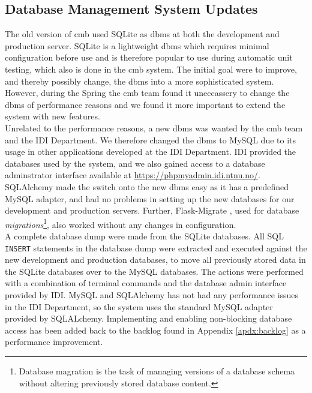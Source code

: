 \subsection{Database Management System Updates}
The old version of \gls{cmb} used SQLite \cite{SQLITE} as \gls{dbms} at both the development and production server. SQLite is a lightweight \gls{dbms} which requires minimal configuration before use and is therefore popular to use during automatic unit testing, which also is done in the \gls{cmb} system. The initial goal were to improve, and thereby possibly change, the \gls{dbms} into a more sophisticated system. However, during the Spring the \gls{cmb} team found it uneccassery to change the \gls{dbms} of performance reasons and we found it more important to extend the system with new features. \\

Unrelated to the performance reasons, a new \gls{dbms} was wanted by the \gls{cmb} team and the IDI Department. We therefore changed the \gls{dbms} to MySQL due to its usage in other applications developed at the IDI Department. IDI provided the databases used by the system, and we also gained access to a database adminstrator interface available at \url{https://phpmyadmin.idi.ntnu.no/}. SQLAlchemy made the switch onto the new \gls{dbms} easy as it has a predefined MySQL adapter, and had no problems in setting up the new databases for our development and production servers. Further, Flask-Migrate \cite{FLASKMIGRATE}, used for database \textit{migrations}\footnote{Database magration is the task of managing versions of a database schema without altering previously stored database content.}, also worked without any changes in configuration. \\

A complete database dump were made from the SQLite databases. All SQL \texttt{INSERT} statements in the database dump were extracted and executed against the new development and production databases, to move all previously stored data in the SQLite databases over to the MySQL databases. The actions were performed with a combination of terminal commands and the database admin interface provided by IDI. MySQL and SQLAlchemy has not had any performance issues in the IDI Department, so the system uses the standard MySQL adapter provided by SQLALchemy. Implementing and enabling non-blocking database access has been added back to the backlog found in Appendix \ref{apdx:backlog} as a performance improvement.

